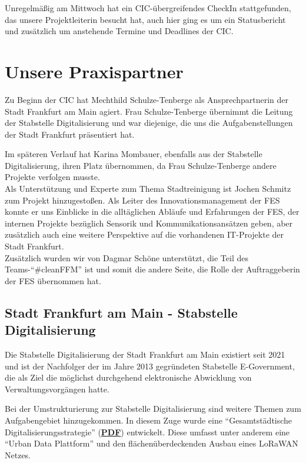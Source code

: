         Unregelmäßig am Mittwoch hat ein CIC-übergreifendes CheckIn stattgefunden, das unsere Projektleiterin besucht hat, auch hier ging es um ein Statusbericht und zusätzlich um anstehende Termine und Deadlines der CIC.



\section{Unsere Praxispartner}

    Zu Beginn der CIC hat Mechthild Schulze-Tenberge als Ansprechpartnerin der Stadt Frankfurt am Main agiert.
    Frau Schulze-Tenberge übernimmt die Leitung der Stabstelle Digitalisierung und war diejenige, die uns die Aufgabenstellungen der Stadt Frankfurt präsentiert hat.

    Im späteren Verlauf hat Karina Mombauer, ebenfalls aus der Stabstelle Digitalisierung, ihren Platz übernommen, da Frau Schulze-Tenberge andere Projekte verfolgen musste. \\

    Als Unterstützung und Experte zum Thema Stadtreinigung ist Jochen Schmitz zum Projekt hinzugestoßen. Als Leiter des Innovationsmanagement der FES konnte er uns Einblicke in die alltäglichen Abläufe und Erfahrungen der FES, der internen Projekte bezüglich Sensorik und Kommunikationsansätzen geben, aber zusätzlich auch eine weitere Perspektive auf die vorhandenen IT-Projekte der Stadt Frankfurt. \\

    Zusätzlich wurden wir von Dagmar Schöne unterstützt, die Teil des Teams-\enquote{\#cleanFFM} ist und somit die andere Seite, die Rolle der Auftraggeberin der FES übernommen hat.
    
    \subsection{Stadt Frankfurt am Main - Stabstelle Digitalisierung}

        Die Stabstelle Digitalisierung der Stadt Frankfurt am Main existiert seit 2021 und ist der Nachfolger der im Jahre 2013 gegründeten Stabstelle E-Government, die als Ziel die möglichst durchgehend elektronische Abwicklung von Verwaltungsvorgängen hatte.
        
        Bei der Umstrukturierung zur Stabstelle Digitalisierung sind weitere Themen zum Aufgabengebiet hinzugekommen.
        In diesem Zuge wurde eine \enquote{Gesamtstädtische Digitalisierungsstrategie} (\href{run:attachments/Frankfurt_Digitalisierungsstrategie.pdf}{\textbf{PDF}}) entwickelt.
        Diese umfasst unter anderem eine \enquote{Urban Data Plattform} und den flächenüberdeckenden Ausbau eines LoRaWAN Netzes.

